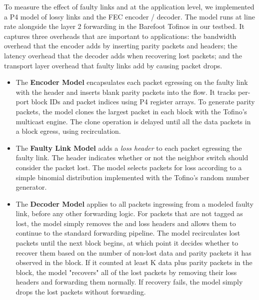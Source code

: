 To measure the effect of faulty links and
\OurSys at the application level, we implemented a P4 model of lossy links and
the FEC encoder / decoder. The model runs at line  rate alongside the layer 2
forwarding in the Barefoot Tofinos in our  testbed. It captures three
overheads that are important to applications: the bandwidth overhead that the
encoder adds by inserting parity packets and \OurSys headers; the latency
overhead that the decoder adds when recovering lost packets; and the transport
layer overhead that faulty links add by causing packet drops.

\begin{itemize}

\item The \textbf{Encoder Model} encapsulates each packet  egressing on the
faulty link with the \OurSys header and inserts blank  parity packets into the
flow. It tracks per-port block IDs and  packet indices using P4 register
arrays. To generate parity packets, the  model clones the largest packet in
each block with the Tofino's multicast engine. The clone operation is 
delayed until all the data packets in a block egress, using recirculation.


\item The \textbf{Faulty Link Model} adds a \emph{loss header} to each packet
egressing the faulty link. The header indicates whether or not the neighbor
switch should consider the packet lost. The model selects packets for loss
according to a simple binomial distribution implemented with the Tofino's
random number generator.

\item The \textbf{Decoder Model} applies to all packets ingressing from a
modeled faulty link, before any other forwarding logic. For packets that are
not tagged as lost, the model simply removes the \OurSys and loss headers and
allows them to continue to the standard forwarding  pipeline. The model
recirculates  lost packets until the next block begins, at which point it
decides whether  to recover them based on the number of non-lost data and
parity packets it has  observed in the block.  If it counted at least K data
plus parity packets  in the block, the model  "recovers" all of the lost
packets by removing their loss headers and  forwarding them normally. If
recovery fails, the model simply drops the  lost packets without forwarding.

\end{itemize}

